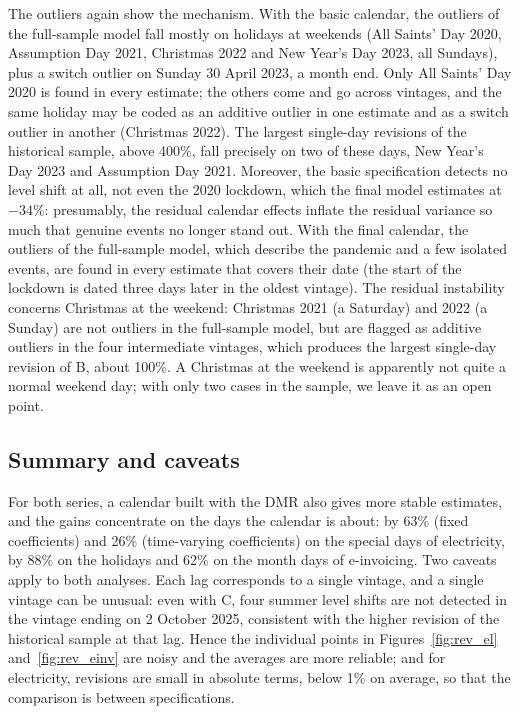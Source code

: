 \documentclass[Afour, times]{sagej}
\begin{document}
The outliers again show the mechanism. With the basic calendar, the outliers of the full-sample model fall mostly on holidays at weekends (All Saints' Day 2020, Assumption Day 2021, Christmas 2022 and New Year's Day 2023, all Sundays), plus a switch outlier on Sunday 30 April 2023, a month end. Only All Saints' Day 2020 is found in every estimate; the others come and go across vintages, and the same holiday may be coded as an additive outlier in one estimate and as a switch outlier in another (Christmas 2022). The largest single-day revisions of the historical sample, above 400\%, fall precisely on two of these days, New Year's Day 2023 and Assumption Day 2021. Moreover, the basic specification detects no level shift at all, not even the 2020 lockdown, which the final model estimates at $-34\%$: presumably, the residual calendar effects inflate the residual variance so much that genuine events no longer stand out. With the final calendar, the outliers of the full-sample model, which describe the pandemic and a few isolated events, are found in every estimate that covers their date (the start of the lockdown is dated three days later in the oldest vintage). The residual instability concerns Christmas at the weekend: Christmas 2021 (a Saturday) and 2022 (a Sunday) are not outliers in the full-sample model, but are flagged as additive outliers in the four intermediate vintages, which produces the largest single-day revision of B, about 100\%. A Christmas at the weekend is apparently not quite a normal weekend day; with only two cases in the sample, we leave it as an open point.

\subsection{Summary and caveats}

For both series, a calendar built with the DMR also gives more stable estimates, and the gains concentrate on the days the calendar is about: by 63\% (fixed coefficients) and 26\% (time-varying coefficients) on the special days of electricity, by 88\% on the holidays and 62\% on the month days of e-invoicing. Two caveats apply to both analyses. Each lag corresponds to a single vintage, and a single vintage can be unusual: even with C, four summer level shifts are not detected in the vintage ending on 2 October 2025, consistent with the higher revision of the historical sample at that lag. Hence the individual points in Figures~\ref{fig:rev_el} and~\ref{fig:rev_einv} are noisy and the averages are more reliable; and for electricity, revisions are small in absolute terms, below 1\% on average, so that the comparison is between specifications.
\end{document}
